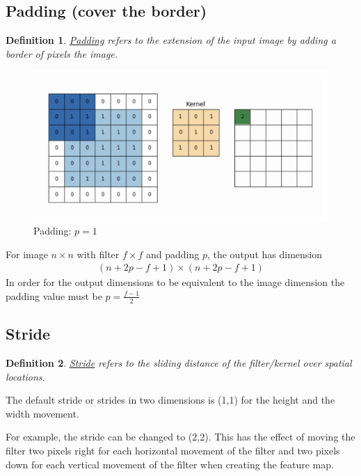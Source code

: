 \documentclass[11pt,a4paper]{article}
\newtheorem{definition}{Definition}
\begin{document}
\subsection{Padding (cover the border)}
\begin{definition}
    \underline{Padding} refers to the extension of the input image by adding a border of pixels the image.
\end{definition}
\begin{center}\begin{figure}[htbp]
    \centering
    \includegraphics[scale=0.15]{Padding.png}
    \caption{Padding: $p=1$}
    \label{}
\end{figure}\end{center}
For image $n\times n$ with filter $f\times f$ and padding $p$, the output has dimension
\begin{equation}
    \begin{aligned}
        (n+2p-f +1)\times (n+2p-f +1)
    \end{aligned}
    \nonumber
\end{equation}
In order for the output dimensions to be equivalent to the image dimension the padding value must be $p=\frac{f-1}{2}$

\subsection{Stride}
\begin{definition}
    \underline{Stride} refers to the sliding distance of the filter/kernel over spatial locations.
\end{definition}
The default stride or strides in two dimensions is (1,1) for the height and the width movement.

For example, the stride can be changed to (2,2). This has the effect of moving the filter two pixels right for each horizontal movement of the filter and two pixels down for each vertical movement of the filter when creating the feature map.
\end{document}

